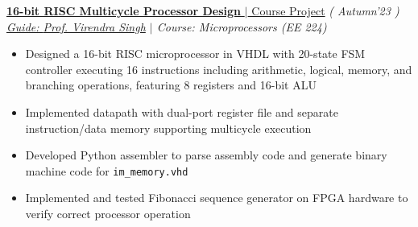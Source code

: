 \begin{flushleft}
	\vspace{-6pt}
	\href{https://github.com/Bhuvansh-Goyal-IITB/CPU-16-bit}{\textbf{16-bit RISC Multicycle Processor Design} $|$ Course Project}
	\hfill{ \small{\it( Autumn'23 )}}
	\\

	\hspace{-3pt}\textit{ \href{https://www.ee.iitb.ac.in/~viren/}{Guide: {Prof. Virendra Singh}}
	$|$ Course: Microprocessors (EE 224)} \\
	\vspace{-7pt}

	\begin{itemize}[itemsep = -0.75 mm, leftmargin=*]
		\item Designed a 16-bit RISC microprocessor in VHDL with 20-state FSM controller executing 16 instructions including arithmetic, logical, memory, and branching operations, featuring 8 registers and 16-bit ALU
		\item Implemented datapath with dual-port register file and separate instruction/data memory supporting multicycle execution
		\item Developed Python assembler to parse assembly code and generate binary machine code for \texttt{im\_memory.vhd}
		\item Implemented and tested Fibonacci sequence generator on FPGA hardware to verify correct processor operation
	\end{itemize}
\end{flushleft}
